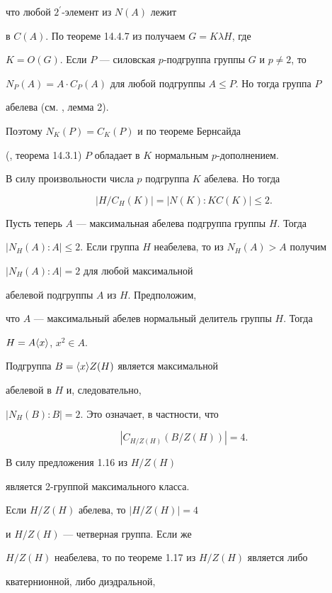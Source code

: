 что любой $2^\prime$-элемент из $N(A)$ лежит


в $C(A)$. По теореме 14.4.7 из \cite{hall} получаем $G=K\lambda H$, где


$K=O(G)$. Если $P$ --- силовская $p$-подгруппа группы $G$ и $p\ne 2$, то


$N_P(A)=A\cdot C_P(A)$ для любой подгруппы $A\le P$. Но тогда группа $P$


абелева (см. \cite{ant1}, лемма 2).


Поэтому $N_K(P)=C_K(P)$ и по теореме Бернсайда


(\cite{hall}, теорема 14.3.1) $P$ обладает в $K$ нормальным $p$-дополнением.


В силу произвольности числа $p$ подгруппа $K$ абелева. Но тогда


$$


|H/C_H(K)|=|N(K):KC(K)|\le 2.


$$





Пусть теперь $A$ --- максимальная абелева подгруппа группы $H$. Тогда


$|N_H(A):A|\le 2$. Если группа $H$ неабелева, то из $N_H(A)>A$ получим


$|N_H(A):A|=2$ для любой максимальной 


абелевой подгруппы $A$ из $H$. Предположим,


что $A$ --- максимальный абелев нормальный делитель группы $H$. Тогда


$H=A\langle x\rangle$, $x^2\in A$.





Подгруппа $B=\langle x\rangle Z(H)$ является максимальной 


абелевой в $H$ и, следовательно,


$|N_H(B):B|=2$. Это означает, в частности, что


$$


|C_{H/Z(H)}(B/Z(H))|=4.


$$


В силу предложения 1.16 из \cite{gor} $H/Z(H)$ 


является 2-группой максимального класса.


Если $H/Z(H)$ абелева, то $|H/Z(H)|=4$


и $H/Z(H)$ --- четверная группа. Если же


$H/Z(H)$ неабелева, то по теореме 1.17 из \cite{gor} $H/Z(H)$ является либо


кватернионной, либо диэдральной, 


